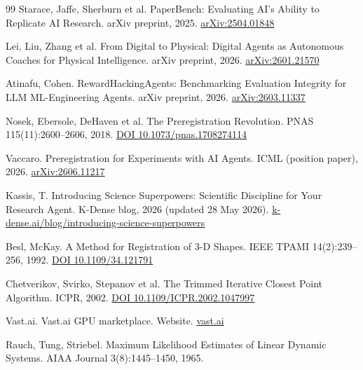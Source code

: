\documentclass[11pt]{article}
\begin{document}
\begin{thebibliography}{99}
 Starace, Jaffe, Sherburn et al. PaperBench: Evaluating AI's Ability to Replicate AI Research. arXiv preprint, 2025. \href{https://arxiv.org/abs/2504.01848}{arXiv:2504.01848}

 Lei, Liu, Zhang et al. From Digital to Physical: Digital Agents as Autonomous Coaches for Physical Intelligence. arXiv preprint, 2026. \href{https://arxiv.org/abs/2601.21570}{arXiv:2601.21570}

 Atinafu, Cohen. RewardHackingAgents: Benchmarking Evaluation Integrity for LLM ML-Engineering Agents. arXiv preprint, 2026. \href{https://arxiv.org/abs/2603.11337}{arXiv:2603.11337}

 Nosek, Ebersole, DeHaven et al. The Preregistration Revolution. PNAS 115(11):2600–2606, 2018. \href{https://doi.org/10.1073/pnas.1708274114}{DOI 10.1073/pnas.1708274114}

 Vaccaro. Preregistration for Experiments with AI Agents. ICML (position paper), 2026. \href{https://arxiv.org/abs/2606.11217}{arXiv:2606.11217}

 Kassis, T. Introducing Science Superpowers: Scientific Discipline for Your Research Agent. K-Dense blog, 2026 (updated 28 May 2026). \href{https://www.k-dense.ai/blog/introducing-science-superpowers}{k-dense.ai/blog/introducing-science-superpowers}

 Besl, McKay. A Method for Registration of 3-D Shapes. IEEE TPAMI 14(2):239–256, 1992. \href{https://doi.org/10.1109/34.121791}{DOI 10.1109/34.121791}

 Chetverikov, Svirko, Stepanov et al. The Trimmed Iterative Closest Point Algorithm. ICPR, 2002. \href{https://doi.org/10.1109/ICPR.2002.1047997}{DOI 10.1109/ICPR.2002.1047997}

 Vast.ai. Vast.ai GPU marketplace. Website. \href{https://vast.ai}{vast.ai}

 Rauch, Tung, Striebel. Maximum Likelihood Estimates of Linear Dynamic Systems. AIAA Journal 3(8):1445–1450, 1965.

\end{thebibliography}
\end{document}
